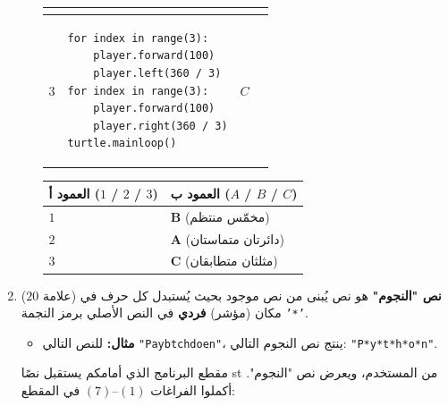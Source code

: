 \documentclass[14pt]{extarticle}
\begin{document}
\begin{enumerate}[resume, label=\textbf{السؤال \arabic*:}, wide=0pt, itemsep=2.2em]
\begin{enumerate}[label=\alph*.]
{\begin{longtable}{|C{0.9cm}|p{7.2cm}|C{0.9cm}|C{5.2cm}|}
\begin{english}
\end{english}
\\ \hline
$3$ &
\begin{pycell}
\begin{english}
\begin{verbatim}
for index in range(3):
    player.forward(100)
    player.left(360 / 3)
for index in range(3):
    player.forward(100)
    player.right(360 / 3)
turtle.mainloop()
\end{verbatim}
\end{english}
\end{pycell}
& $C$ &
\begin{english}
\vspace{0.1cm}
\end{english}
\\ \hline
\end{longtable}}

{\renewcommand{\arraystretch}{1.3}
\begin{longtable}{|C{4.5cm}|C{4.5cm}|}
\hline
\textbf{العمود أ ($1$ / $2$ / $3$)} & \textbf{العمود ب ($A$ / $B$ / $C$)} \\
\hline
$1$ & \ifwithsols $\mathbf{B}$ (مخمّس منتظم) \fi \\ \hline
$2$ & \ifwithsols $\mathbf{A}$ (دائرتان متماستان) \fi \\ \hline
$3$ & \ifwithsols $\mathbf{C}$ (مثلثان متطابقان) \fi \\ \hline
\end{longtable}}
\filbreak
\end{enumerate}
\filbreak

\item ($20$ علامة) \textbf{نص "النجوم"} هو نص يُبنى من نص موجود بحيث يُستبدل كل حرف في مكان (مؤشر) \textbf{فردي} في النص الأصلي برمز النجمة \textenglish{\texttt{'*'}}.
\begin{itemize}
\item \textbf{مثال:} للنص التالي \textenglish{\texttt{"Paybtchdoen"}}، ينتج نص النجوم التالي: \textenglish{\texttt{"P*y*t*h*o*n"}}.
\end{itemize}
مقطع البرنامج الذي أمامكم يستقبل نصًا \textenglish{st} من المستخدم، ويعرض نص "النجوم". أكملوا الفراغات $(1)$–$(7)$ في المقطع:


\end{enumerate}
\end{document}
